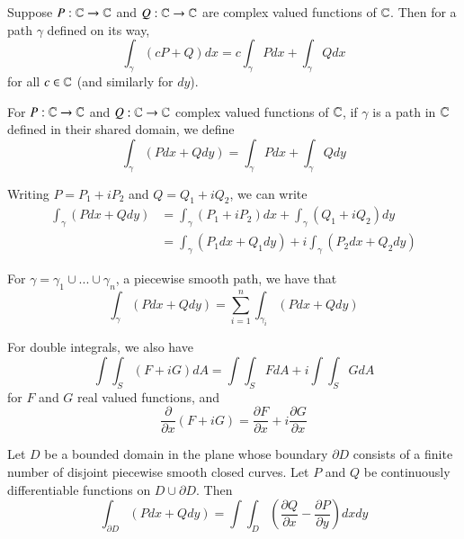 \documentclass[12pt, a4paper, oneside, openright, titlepage]{book}
\begin{document}
\begin{prop}
    Suppose $P:\mathbb C\rightarrow \mathbb C$ and $Q:\mathbb C\rightarrow \mathbb C$ are complex valued functions of $\mathbb C$. Then for a path $\gamma$ defined on its way, \begin{equation*}
        \int_{\gamma}(cP+Q)dx = c\int_{\gamma}Pdx+\int_{\gamma}Qdx
    \end{equation*}
    for all $c \in \mathbb C$ (and similarly for $dy$).
\end{prop}

\begin{defn}
    For $P:\mathbb C\rightarrow \mathbb C$ and $Q:\mathbb C\rightarrow \mathbb C$ complex valued functions of $\mathbb C$, if $\gamma$ is a path in $\mathbb C$ defined in their shared domain, we define \begin{equation*}
        \int_{\gamma}(Pdx+Qdy) = \int_{\gamma}Pdx+\int_{\gamma}Qdy
    \end{equation*}
\end{defn}

Writing $P = P_1 + iP_2$ and $Q = Q_1+iQ_2$, we can write \begin{align*}
    \int_{\gamma}(Pdx+Qdy) &= \int_{\gamma}(P_1+iP_2)dx + \int_{\gamma}(Q_1+iQ_2)dy \\
    &= \int_{\gamma}(P_1dx+Q_1dy)+i\int_{\gamma}(P_2dx+Q_2dy)
\end{align*}

For $\gamma = \gamma_1\cup...\cup\gamma_n$, a piecewise smooth path, we have that \begin{equation*}
    \int_{\gamma}(Pdx+Qdy) = \sum_{i=1}^n\int_{\gamma_i}(Pdx+Qdy)
\end{equation*}


For double integrals, we also have \begin{equation*}
    \int\int_S(F+iG)dA = \int\int_SFdA + i\int\int_SGdA
\end{equation*}
for $F$ and $G$ real valued functions, and \begin{equation*}
    \frac{\partial}{\partial x}(F+iG) = \frac{\partial F}{\partial x}+i\frac{\partial G}{\partial x}
\end{equation*}

\begin{thm}
    Let $D$ be a bounded domain in the plane whose boundary $\partial D$ consists of a finite number of disjoint piecewise smooth closed curves. Let $P$ and $Q$ be continuously differentiable functions on $D\cup \partial D$. Then \begin{equation*}
        \int_{\partial D}(Pdx+Qdy) = \int\int_D\left(\frac{\partial Q}{\partial x} - \frac{\partial P}{\partial y}\right)dxdy
    \end{equation*}
\end{thm}
\end{document}
